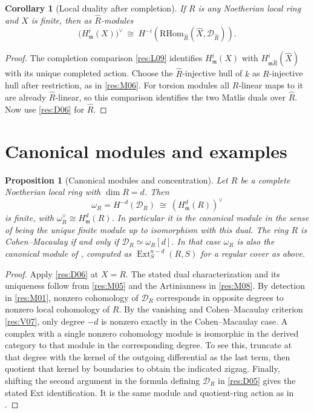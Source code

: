 \documentclass[11pt,oneside,openany]{book}
\newtheorem{proposition}[theorem]{Proposition}
\newtheorem{corollary}[theorem]{Corollary}
\theoremstyle{definition}
\theoremstyle{remark}
\begin{document}
\begin{corollary}[Local duality after completion]\label{res:D07}
If $R$ is any Noetherian local ring and $X$ is finite, then as
$\widehat R$-modules
\[
 \bigl(H^i_{\mathfrak m}(X)\bigr)^\vee
 \ \cong\
 H^{-i}\!\left(\mathrm{RHom}_{\widehat R}
        (\widehat X,\mathcal D_{\widehat R})\right).
\]
\end{corollary}
\begin{proof}
The completion comparison \ref{res:L09} identifies
$H^i_{\mathfrak m}(X)$ with
$H^i_{\mathfrak m\widehat R}(\widehat X)$ with its unique
completed action. Choose the $\widehat R$-injective hull of
$k$ as $R$-injective hull after restriction, as in \ref{res:M06}.
For torsion modules all $R$-linear maps to it are already
$\widehat R$-linear, so this comparison identifies the two
Matlis duals over $\widehat R$. Now use \ref{res:D06} for
$\widehat R$.
\end{proof}

\section{Canonical modules and examples}

\begin{proposition}[Canonical modules and concentration]\label{res:D08}
Let $R$ be a complete Noetherian local ring with $\dim R=d$. Then
\[
      \omega_R=H^{-d}(\mathcal D_R)
             \ \cong\ (H^d_{\mathfrak m}(R))^\vee
\]
is finite, with $\omega_R^\vee\cong H^d_{\mathfrak m}(R)$. In
particular it is the canonical module in the sense of being the
unique finite module up to isomorphism with this dual. The ring
$R$ is Cohen--Macaulay if and only if
$\mathcal D_R\simeq\omega_R[d]$. In that case $\omega_R$ is also
the canonical module of \cite[GC-10]{core}, computed as
$\operatorname{Ext}^{n-d}_S(R,S)$ for a regular cover as above.
\end{proposition}
\begin{proof}
Apply \ref{res:D06} at $X=R$. The stated dual characterization
and its uniqueness follow from \ref{res:M05} and the Artinianness
in \ref{res:M08}. By detection in \ref{res:M01}, nonzero
cohomology of $\mathcal D_R$ corresponds in opposite degrees to
nonzero local cohomology of $R$. By the vanishing and
Cohen--Macaulay criterion \ref{res:V07}, only degree $-d$ is
nonzero exactly in the Cohen--Macaulay case. A complex with a
single nonzero cohomology module is isomorphic in the derived
category to that module in the corresponding degree. To see this,
truncate at that degree with the kernel of the outgoing
differential as the last term, then quotient that kernel by
boundaries to obtain the indicated zigzag. Finally, shifting
the second argument in the formula defining $\mathcal D_R$ in
\ref{res:D05} gives the stated Ext identification. It is the
same module and quotient-ring action as in \cite[GC-10]{core}.
\end{proof}
\end{document}
